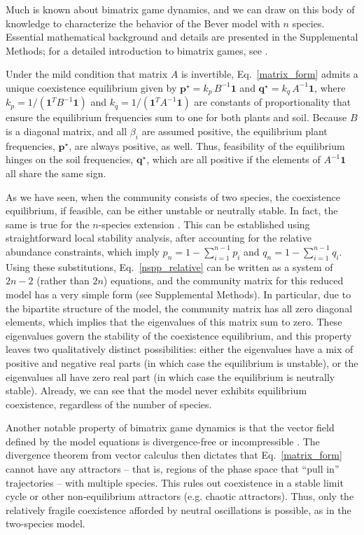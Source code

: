 \documentclass[11pt]{article}
\begin{document}
Much is known about bimatrix game dynamics, and we can draw on this body of knowledge to characterize the behavior of the Bever model with $n$ species. Essential mathematical background and details are presented in the Supplemental Methods; for a detailed introduction to bimatrix games, see \citet{hofbauer1998evolutionary}.

Under the mild condition that matrix $A$ is invertible, Eq.~\ref{matrix_form} admits a unique coexistence equilibrium given by $\bm{p}^\star = k_p \, B^{-1} \bm{1}$ and $\bm{q}^\star = k_q \, A^{-1} \bm{1}$, where $k_p = 1 / (\bm{1}^T B^{-1} \bm{1})$ and $k_q = 1 / (\bm{1}^T A^{-1} \bm{1})$ are constants of proportionality that ensure the equilibrium frequencies sum to one for both plants and soil. Because $B$ is a diagonal matrix, and all $\beta_i$ are assumed positive, the equilibrium plant frequencies, $\bm{p}^\star$, are always positive, as well. Thus, feasibility of the equilibrium hinges on the soil frequencies, $\bm{q}^\star$, which are all positive if the elements of $A^{-1} \bm{1}$ all share the same sign.

As we have seen, when the community consists of two species, the coexistence equilibrium, if feasible, can be either unstable or neutrally stable. In fact, the same is true for the $n$-species extension  \citep[and, more generally, for any bimatrix game dynamics,][]{eshel1983coevolutionary,selten1988note,hofbauer1998evolutionary}. This can be established using straightforward local stability analysis, after accounting for the relative abundance constraints, which imply $p_n = 1 - \sum_{i = 1}^{n-1} p_i$ and $q_n = 1 - \sum_{i = 1}^{n-1} q_i$. Using these substitutions, Eq.~\ref{nspp_relative} can be written as a system of $2 n - 2$ (rather than $2 n$) equations, and the community matrix for this reduced model has a very simple form (see Supplemental Methods). In particular, due to the bipartite structure of the model, the community matrix has all zero diagonal elements, which implies that the eigenvalues of this matrix sum to zero. These eigenvalues govern the stability of the coexistence equilibrium, and this property leaves two qualitatively distinct possibilities: either the eigenvalues have a mix of positive and negative real parts (in which case the equilibrium is unstable), or the eigenvalues all have zero real part (in which case the equilibrium is neutrally stable). Already, we can see that the model never exhibits equilibrium coexistence, regardless of the number of species.

Another notable property of bimatrix game dynamics is that the vector field defined by the model equations is divergence-free or incompressible \citep[see][for a proof]{hofbauer1998evolutionary}. The divergence theorem from vector calculus \citep{arfken1985mathematical} then dictates that Eq.~\ref{matrix_form} cannot have any attractors -- that is, regions of the phase space that ``pull in'' trajectories -- with multiple species. This rules out coexistence in a stable limit cycle or other non-equilibrium attractors (e.g. chaotic attractors). Thus, only the relatively fragile coexistence afforded by neutral oscillations is possible, as in the two-species model.
\end{document}
